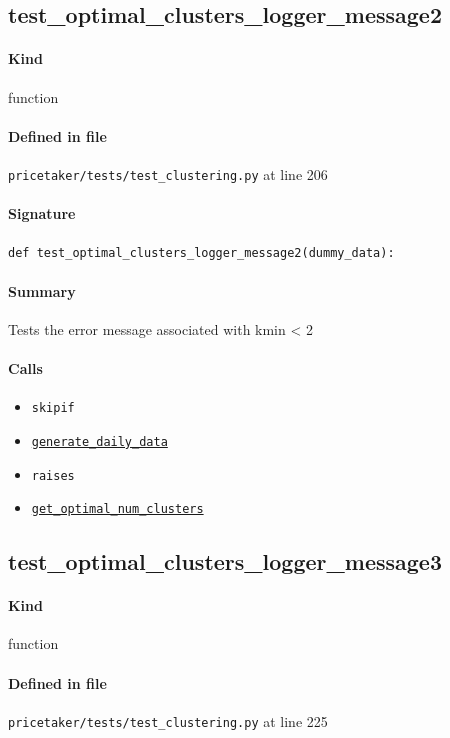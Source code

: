 \documentclass[11pt]{report}
\begin{document}
\subsection{test\_optimal\_clusters\_logger\_message2}
\label{def:pricetaker-tests-test_clustering.py:test_optimal_clusters_logger_message2:L206}
\paragraph{Kind} function
\paragraph{Defined in file} \texttt{pricetaker/tests/test\_clustering.py} at line 206
\paragraph{Signature} \texttt{def test\_optimal\_clusters\_logger\_message2(dummy\_data):}
\paragraph{Summary} Tests the error message associated with kmin < 2
\paragraph{Calls}
\begin{itemize}[leftmargin=*]
  \item \texttt{skipif}
  \item \hyperref[def:pricetaker-clustering.py:generate_daily_data:L35]{\texttt{generate\_daily\_data}}
  \item \texttt{raises}
  \item \hyperref[def:pricetaker-clustering.py:get_optimal_num_clusters:L142]{\texttt{get\_optimal\_num\_clusters}}
\end{itemize}
\subsection{test\_optimal\_clusters\_logger\_message3}
\label{def:pricetaker-tests-test_clustering.py:test_optimal_clusters_logger_message3:L225}
\paragraph{Kind} function
\paragraph{Defined in file} \texttt{pricetaker/tests/test\_clustering.py} at line 225
\end{document}
